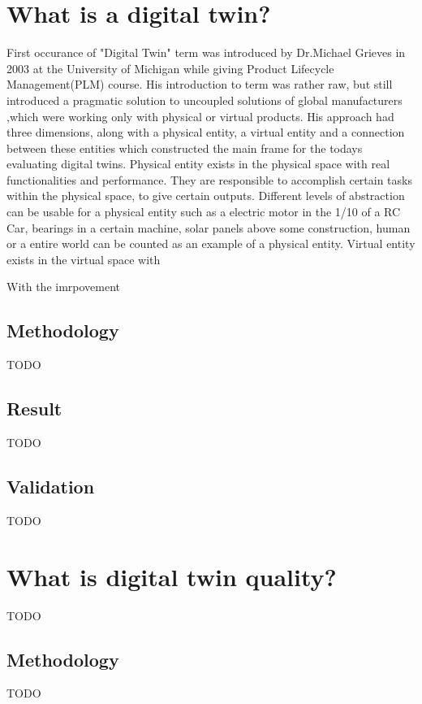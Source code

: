 \documentclass[conference]{IEEEtran}
\begin{document}
    \section{What is a digital twin?}
    First occurance of "Digital Twin" term  was introduced by Dr.Michael Grieves in 2003 at the University of Michigan while giving 
    Product Lifecycle Management(PLM) course.\cite{article} His introduction to term was rather raw, but still introduced a pragmatic solution to uncoupled solutions of global manufacturers
    ,which were working only with physical or virtual products.\newline
    His approach had three dimensions, along with a physical entity, a virtual entity and a connection between these entities which constructed the main frame for the todays evaluating  
    digital twins. \cite{article} \newline
    Physical entity exists in the physical space with real functionalities and performance. They are responsible to accomplish certain tasks within the physical space, to give certain outputs. 
    Different levels of abstraction can be usable for a physical entity such as a electric motor in the 1/10 of a RC Car, bearings in a certain machine, solar panels above some construction, human or a entire world can be counted as an example of a physical entity.
    Virtual entity exists in the virtual space with 

    With the imrpovement 
    
    \subsection{Methodology}
    TODO

    \subsection{Result}
    TODO

    \subsection{Validation}
    TODO

    \section{What is digital twin quality?}
    TODO

    \subsection{Methodology}
    TODO
\end{document}
